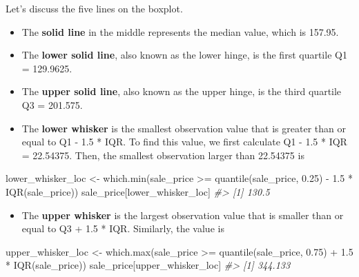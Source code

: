 \documentclass[
]{book}
\newenvironment{Shaded}{\begin{snugshade}}{\end{snugshade}}
\newcommand{\CommentTok}[1]{\textcolor[rgb]{0.56,0.35,0.01}{\textit{#1}}}
\newcommand{\FloatTok}[1]{\textcolor[rgb]{0.00,0.00,0.81}{#1}}
\newcommand{\FunctionTok}[1]{\textcolor[rgb]{0.00,0.00,0.00}{#1}}
\newcommand{\NormalTok}[1]{#1}
\newcommand{\OtherTok}[1]{\textcolor[rgb]{0.56,0.35,0.01}{#1}}
\newcommand{\SpecialCharTok}[1]{\textcolor[rgb]{0.00,0.00,0.00}{#1}}
\providecommand{\tightlist}{%
  \setlength{\itemsep}{0pt}\setlength{\parskip}{0pt}}
\begin{document}
Let's discuss the five lines on the boxplot.

\begin{itemize}
\tightlist
\item
  The \textbf{solid line} in the middle represents the median value, which is 157.95.
\item
  The \textbf{lower solid line}, also known as the lower hinge, is the first quartile Q1 = 129.9625.
\item
  The \textbf{upper solid line}, also known as the upper hinge, is the third quartile Q3 = 201.575.
\item
  The \textbf{lower whisker} is the smallest observation value that is greater than or equal to Q1 - 1.5 * IQR. To find this value, we first calculate Q1 - 1.5 * IQR = 22.54375.
  Then, the smallest observation larger than 22.54375 is
\end{itemize}

\begin{Shaded}
\begin{Highlighting}[]
\NormalTok{lower\_whisker\_loc }\OtherTok{\textless{}{-}} \FunctionTok{which.min}\NormalTok{(sale\_price }\SpecialCharTok{\textgreater{}=} \FunctionTok{quantile}\NormalTok{(sale\_price, }\FloatTok{0.25}\NormalTok{) }\SpecialCharTok{{-}} \FloatTok{1.5} \SpecialCharTok{*} \FunctionTok{IQR}\NormalTok{(sale\_price))}
\NormalTok{sale\_price[lower\_whisker\_loc]}
\CommentTok{\#\textgreater{} [1] 130.5}
\end{Highlighting}
\end{Shaded}

\begin{itemize}
\tightlist
\item
  The \textbf{upper whisker} is the largest observation value that is smaller than or equal to Q3 + 1.5 * IQR. Similarly, the value is
\end{itemize}

\begin{Shaded}
\begin{Highlighting}[]
\NormalTok{upper\_whisker\_loc }\OtherTok{\textless{}{-}} \FunctionTok{which.max}\NormalTok{(sale\_price }\SpecialCharTok{\textgreater{}=} \FunctionTok{quantile}\NormalTok{(sale\_price, }\FloatTok{0.75}\NormalTok{) }\SpecialCharTok{+} \FloatTok{1.5} \SpecialCharTok{*} \FunctionTok{IQR}\NormalTok{(sale\_price))}
\NormalTok{sale\_price[upper\_whisker\_loc]}
\CommentTok{\#\textgreater{} [1] 344.133}
\end{Highlighting}
\end{Shaded}
\end{document}
